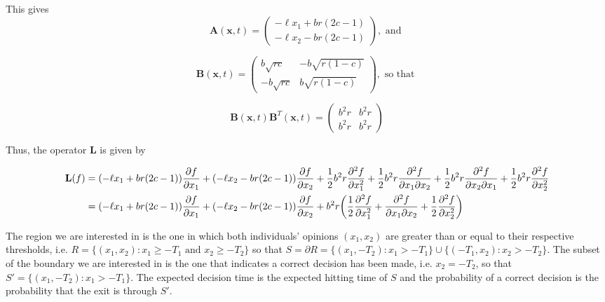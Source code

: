 \documentclass{article}
\newcommand{\mb}{\mathbf}
\begin{document}
This gives 
\begin{equation}
{\mb A}({\mb x},t)=\left(\begin{array}{ll} 
-\ell x_1+br(2c-1)
\\ -\ell x_2-br(2c-1)
\end{array}\right), \text{ and }
\end{equation}

\begin{equation}
{\mb B}({\mb x},t)=\left(\begin{array}{ll} 
b\sqrt{rc} & -b\sqrt{r(1-c)}
\\ -b\sqrt{rc} & b\sqrt{r(1-c)}
\end{array}\right), \text{ so that }
\end{equation}

\begin{equation}
{\mb B}({\mb x},t){\mb B}^T({\mb x},t)
=\left(\begin{array}{ll}
b^2r & b^2r
\\ b^2r & b^2r
\end{array}\right)
\end{equation}

Thus, the operator ${\mb L}$ is given by

\begin{align}
{\mb L}(f)&=(-\ell x_1+br(2c-1))\frac{\partial f}{\partial x_1}+(-\ell x_2-br(2c-1))\frac{\partial f}{\partial x_2}+\frac{1}{2}b^2r\frac{\partial^2 f}{\partial x_1^2}+\frac{1}{2}b^2r\frac{\partial^2 f}{\partial x_1\partial x_2}+\frac{1}{2}b^2r\frac{\partial^2 f}{\partial x_2\partial x_1}+\frac{1}{2}b^2r\frac{\partial^2 f}{\partial x_2^2} \notag
\\&=(-\ell x_1+br(2c-1))\frac{\partial f}{\partial x_1}+(-\ell x_2-br(2c-1))\frac{\partial f}{\partial x_2}+b^2r\bigg(\frac{1}{2}\frac{\partial^2 f}{\partial x_1^2}+\frac{\partial^2 f}{\partial x_1\partial x_2}+\frac{1}{2}\frac{\partial^2 f}{\partial x_2^2} \bigg)
\end{align}

The region we are interested in is the one in which both individuals' opinions $(x_1,x_2)$ are greater than or equal to their respective thresholds, i.e. $R=\{(x_1,x_2): x_1\geq -T_1 \text{ and } x_2\geq -T_2\}$ so that $S=\partial R=\{(x_1,-T_2): x_1>-T_1\}\cup\{(-T_1,x_2):x_2>-T_2\}$.  The subset of the boundary we are interested in is the one that indicates a correct decision has been made, i.e. $x_2=-T_2$, so that $S'=\{(x_1,-T_2):x_1>-T_1\}$. The expected decision time is the expected hitting time of $S$ and the probability of a correct decision is the probability that the exit is through $S'$. 
\end{document}
